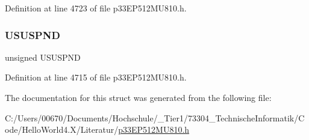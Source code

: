 Definition at line 4723 of file p33\+E\+P512\+M\+U810.\+h.

\mbox{\label{structtag_u1_p_w_r_c_b_i_t_s_a9168ae95bb66f02230189d986bc41779}} 
\subsubsection{\texorpdfstring{U\+S\+U\+S\+P\+ND}{USUSPND}}
{\footnotesize\ttfamily unsigned U\+S\+U\+S\+P\+ND}



Definition at line 4715 of file p33\+E\+P512\+M\+U810.\+h.



The documentation for this struct was generated from the following file\+:\begin{DoxyCompactItemize}
\item 
C\+:/\+Users/00670/\+Documents/\+Hochschule/\+\_\+\+Tier1/73304\+\_\+\+Technische\+Informatik/\+Code/\+Hello\+World4.\+X/\+Literatur/\hyperlink{p33_e_p512_m_u810_8h}{p33\+E\+P512\+M\+U810.\+h}\end{DoxyCompactItemize}
